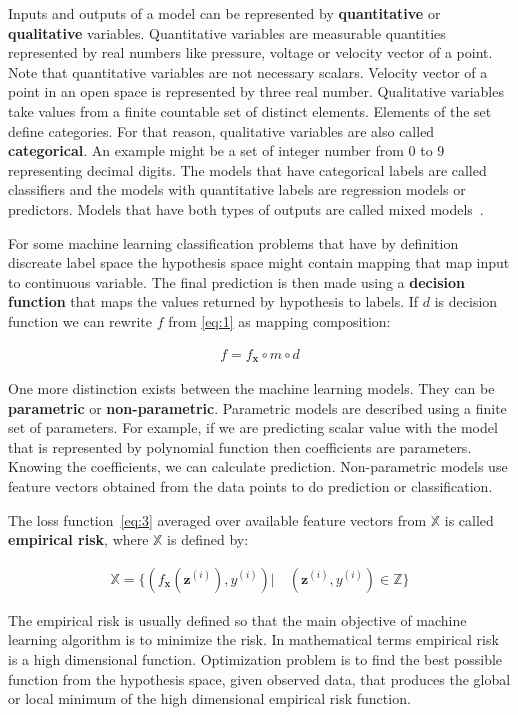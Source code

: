 \documentclass[english, 12pt, a4paper, elec, utf8, online]{aaltothesis}
\begin{document}
Inputs and outputs of a model can be represented by \textbf{quantitative} or \textbf{qualitative} variables. Quantitative variables are measurable quantities represented by real numbers like pressure, voltage or velocity vector of a point. Note that quantitative variables are not necessary scalars. Velocity vector of a point in an open space is represented by three real number. Qualitative variables take values from a finite countable set of distinct elements. Elements of the set define categories. For that reason, qualitative variables are also called \textbf{categorical}. An example might be a set of integer number from 0 to 9 representing decimal digits. The models that have categorical labels are called classifiers and the models with quantitative labels are regression models or predictors. Models that have both types of outputs are called mixed models~\cite{Jung2018}. 

For some machine learning classification problems that have by definition discreate label space the hypothesis space might contain mapping that map input to continuous variable. The final prediction is then made using a \textbf{decision function} that maps the values returned by hypothesis to labels. If $d$ is decision function we can rewrite $f$ from \ref{eq:1} as mapping composition:

\begin{align*}
f = f_{\mathbf{x}} \circ m \circ d
\end{align*}

One more distinction exists between the machine learning models. They can be \textbf{parametric} or \textbf{non-parametric}. Parametric models are described using a finite set of parameters. For example, if we are predicting scalar value with the model that is represented by polynomial function then coefficients are parameters. Knowing the coefficients, we can calculate prediction.  Non-parametric models use feature vectors obtained from the data points to do prediction or classification.  

The loss function~\ref{eq:3} averaged over available feature vectors from $\mathbb{X}$ is called \textbf{empirical risk}, where $\mathbb{X}$ is defined by:

\begin{align}\label{eq:4}
\mathbb{X} =  \{ (f_{\mathbf{x}}(\mathbf{z}^{(i)}), y^{(i)})|\quad (\mathbf{z}^{(i)},y^{(i)}) \in \mathbb{Z} \}
\end{align}

The empirical risk is usually defined so that the main objective of machine learning algorithm is to minimize the risk. In mathematical terms empirical risk is a high dimensional function. Optimization problem is to find the best possible function from the hypothesis space, given observed data, that produces the global or local minimum of the high dimensional empirical risk function.              
\end{document}
